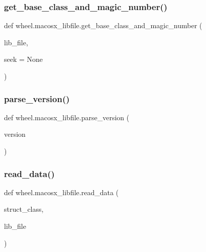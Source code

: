 \subsubsection{\texorpdfstring{get\+\_\+base\+\_\+class\+\_\+and\+\_\+magic\+\_\+number()}{get\_base\_class\_and\_magic\_number()}}
{\footnotesize\ttfamily def wheel.\+macosx\+\_\+libfile.\+get\+\_\+base\+\_\+class\+\_\+and\+\_\+magic\+\_\+number (\begin{DoxyParamCaption}\item[{}]{lib\+\_\+file,  }\item[{}]{seek = {\ttfamily None} }\end{DoxyParamCaption})}

\mbox{\label{namespacewheel_1_1macosx__libfile_abdfb08851e34b7e57d43dc01addf40ce}} 
\subsubsection{\texorpdfstring{parse\+\_\+version()}{parse\_version()}}
{\footnotesize\ttfamily def wheel.\+macosx\+\_\+libfile.\+parse\+\_\+version (\begin{DoxyParamCaption}\item[{}]{version }\end{DoxyParamCaption})}

\mbox{\label{namespacewheel_1_1macosx__libfile_a8289d6e5cf9a06c014ae5091f64cafea}} 
\subsubsection{\texorpdfstring{read\+\_\+data()}{read\_data()}}
{\footnotesize\ttfamily def wheel.\+macosx\+\_\+libfile.\+read\+\_\+data (\begin{DoxyParamCaption}\item[{}]{struct\+\_\+class,  }\item[{}]{lib\+\_\+file }\end{DoxyParamCaption})}

